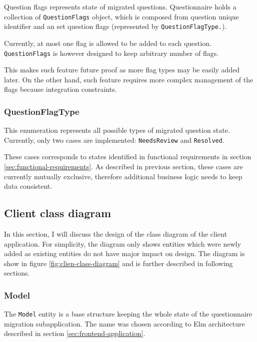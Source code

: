 Question flags represents state of migrated questions.
Questionnaire holds a collection of \texttt{QuestionFlags} object, which is composed from question unique identifier and an set question flags (represented by \texttt{QuestionFlagType.}).

Currently, at most one flag is allowed to be added to each question.
\texttt{QuestionFlags} is however designed to keep arbitrary number of flags.

This makes such feature future proof as more flag types may be easily added later.
On the other hand, such feature requires more complex management of the flags because integration constraints.

\subsubsection*{QuestionFlagType}

This enumeration represents all possible types of migrated question state.
Currently, only two cases are implemented: \texttt{NeedsReview} and \texttt{Resolved}.

These cases corresponds to states identified in functional requirements in section \ref{sec:functional-requirements}.
As described in previous section, these cases are currently mutually exclusive, therefore additional business logic needs to keep data consistent.

\subsection{Client class diagram}

In this section, I will discuss the design of the class diagram of the client application.
For simplicity, the diagram only shows entities which were newly added as existing entities do not have major impact on design.
The diagram is show in figure \ref{fig:clien-class-diagram} and is further described in following sections.


\subsubsection*{Model}

The \texttt{Model} entity is a base structure keeping the whole state of the questionnaire migration subapplication.
The name was chosen according to Elm architecture described in section \ref{sec:frontend-application}.

